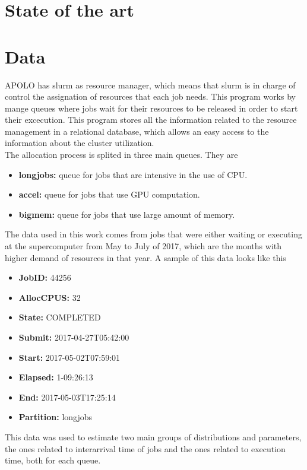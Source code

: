 \documentclass{wscpaperproc}
\begin{document}
\section{State of the art}

\section{Data}

APOLO has slurm \cite{slurm} as resource manager, which means that slurm is in
charge of control the assignation of resources that each job needs. This program
works by mange queues where jobs wait for their resources to be released in
order to start their excecution. This program stores all the information related
to the resource management in a relational database, which allows an easy
access to the information about the cluster utilization.\\

The allocation process is splited in three main queues. They are
\begin{itemize}
    \item \textbf{longjobs:} queue for jobs that are intensive in the use of CPU.
    \item \textbf{accel:} queue for jobs that use GPU computation.
    \item \textbf{bigmem:} queue for jobs that use large amount of memory.
\end{itemize}

The data used in this work comes from jobs that were either waiting or executing
at the supercomputer from May to July of 2017, which are the months with higher
demand of resources in that year. A sample of this data looks like
this

\begin{itemize}
    \item \textbf{JobID:} 44256
    \item \textbf{AllocCPUS:} 32
    \item \textbf{State:} COMPLETED
    \item \textbf{Submit:} 2017-04-27T05:42:00
    \item \textbf{Start:} 2017-05-02T07:59:01
    \item \textbf{Elapsed:} 1-09:26:13
    \item \textbf{End:} 2017-05-03T17:25:14
    \item \textbf{Partition:} longjobs
\end{itemize}

This data was used to estimate two main groups of distributions and parameters,
the ones related to interarrival time of jobs and the ones related to execution
time, both for each queue.
\end{document}
